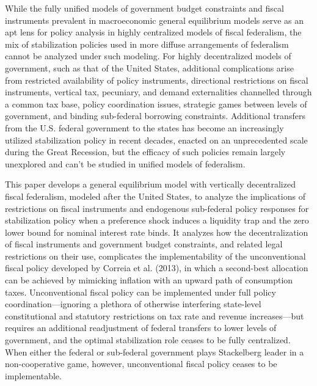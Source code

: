 \documentclass[12pt,letterpaper]{article}
\begin{document}
While the fully unified models of government budget constraints and fiscal instruments prevalent in macroeconomic general equilibrium models serve as an apt lens for policy analysis in highly centralized models of fiscal federalism, the mix of stabilization policies used in more diffuse arrangements of federalism cannot be analyzed under such modeling. For highly decentralized models of government, such as that of the United States, additional complications arise from restricted availability of policy instruments, directional restrictions on fiscal instruments, vertical tax, pecuniary, and demand externalities channelled through a common tax base, policy coordination issues, strategic games between levels of government, and binding sub-federal borrowing constraints. Additional transfers from the U.S. federal government to the states has become an increasingly utilized stabilization policy in recent decades, enacted on an unprecedented scale during the Great Recession, but the efficacy of such policies remain largely unexplored and can't be studied in unified models of federalism. 

This paper develops a general equilibrium model with vertically decentralized fiscal federalism, modeled after the United States, to analyze the implications of restrictions on fiscal instruments and endogenous sub-federal policy responses for stabilization policy when a preference shock induces a liquidity trap and the zero lower bound for nominal interest rate binds. It analyzes how the decentralization of fiscal instruments and government budget constraints, and related legal restrictions on their use, complicates the implementability of the unconventional fiscal policy developed by Correia et al. (2013), in which a second-best allocation can be achieved by mimicking inflation with an upward path of consumption taxes. Unconventional fiscal policy can be implemented under full policy coordination---ignoring a plethora of otherwise interfering state-level constitutional and statutory restrictions on tax rate and revenue increases---but requires an additional readjustment of federal transfers to lower levels of government, and the optimal stabilization role ceases to be fully centralized. When either the federal or sub-federal government plays Stackelberg leader in a non-cooperative game, however, unconventional fiscal policy ceases to be implementable. 
\end{document}
